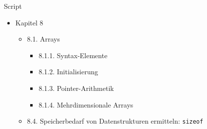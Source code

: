 
\begin{frame}[t,plain]
\titlepage
\end{frame}


\begin{frame}{Script}
%
\begin{itemize}
\item Kapitel 8
	\begin{itemize}
	\item 8.1. Arrays
		\begin{itemize}
		\item 8.1.1. Syntax-Elemente
		\item 8.1.2. Initialisierung
		\item 8.1.3. Pointer-Arithmetik
		\item 8.1.4. Mehrdimensionale Arrays
		\end{itemize}
	\item 8.4. Speicherbedarf von Datenstrukturen ermitteln: \texttt{sizeof}
	\end{itemize}
\end{itemize}
%
\end{frame}


